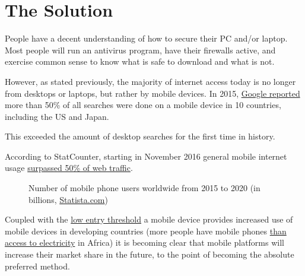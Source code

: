\section{The Solution}\hypertarget{solution}{}

People have a decent understanding of how to secure their PC and/or laptop. Most people will run an antivirus program, have their firewalls active, and exercise common sense to know what is safe to download and what is not. 

However, as stated previously, the majority of internet access today is no longer from desktops or laptops, but rather by mobile devices.  In 2015, \href{https://adwords.googleblog.com/2015/05/building-for-next-moment.html}{Google reported} more than 50\% of all searches were done on a mobile device in 10 countries, including the US and Japan. 

This exceeded the amount of desktop searches for the first time in history.

According to StatCounter, starting in November 2016 general mobile internet usage \href{http://gs.statcounter.com/#mobile_vs_desktop-ww-monthly-201611-201611-bar}{surpassed 50\% of web traffic}.

\begin{figure}[!h]
\centering
{}
\caption*{Number of mobile phone users worldwide from 2015 to 2020 (in billions, \href{https://www.statista.com}{Statista.com})}
\end{figure}

Coupled with the \href{http://gs.statcounter.com/platform-market-share/desktop-mobile-tablet}{low entry threshold} a mobile device provides increased use of mobile devices in developing countries (more people have mobile phones \href{https://www.economist.com/graphic-detail/2017/11/08/in-much-of-sub-saharan-africa-mobile-phones-are-more-common-than-access-to-electricity}{than access to electricity} in Africa) it is becoming clear that mobile platforms will increase their market share in the future, to the point of becoming the absolute preferred method.

